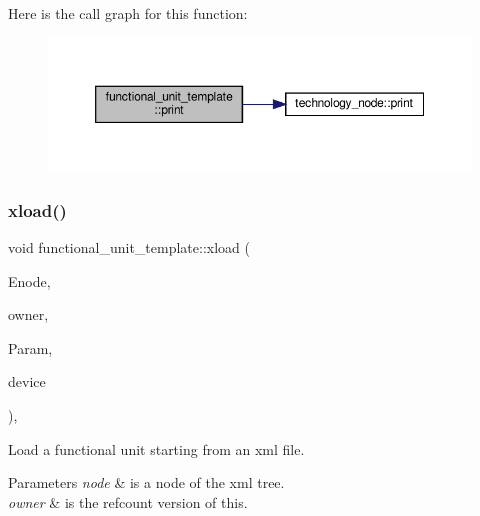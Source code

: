 Here is the call graph for this function\+:
\nopagebreak
\begin{figure}[H]
\begin{center}
\leavevmode
\includegraphics[width=350pt]{d7/d24/structfunctional__unit__template_a4618e5113fff69a045ebc7f974e843b2_cgraph}
\end{center}
\end{figure}
\mbox{\label{structfunctional__unit__template_a648a971318b6dc24eda5156d718443d5}} 
\subsubsection{\texorpdfstring{xload()}{xload()}}
{\footnotesize\ttfamily void functional\+\_\+unit\+\_\+template\+::xload (\begin{DoxyParamCaption}\item[{const \hyperlink{classxml__element}{xml\+\_\+element} $\ast$}]{Enode,  }\item[{const \hyperlink{technology__node_8hpp_a33dd193b7bd6b987bf0d8a770a819fa7}{technology\+\_\+node\+Ref}}]{owner,  }\item[{const \hyperlink{Parameter_8hpp_a37841774a6fcb479b597fdf8955eb4ea}{Parameter\+Const\+Ref}}]{Param,  }\item[{const \hyperlink{target__device_8hpp_acedb2b7a617e27e6354a8049fee44eda}{target\+\_\+device\+Ref}}]{device }\end{DoxyParamCaption})\hspace{0.3cm}{\ttfamily [override]}, {\ttfamily [virtual]}}



Load a functional unit starting from an xml file. 


\begin{DoxyParams}{Parameters}
{\em node} & is a node of the xml tree. \\
\hline
{\em owner} & is the refcount version of this. \\
\hline
\end{DoxyParams}


